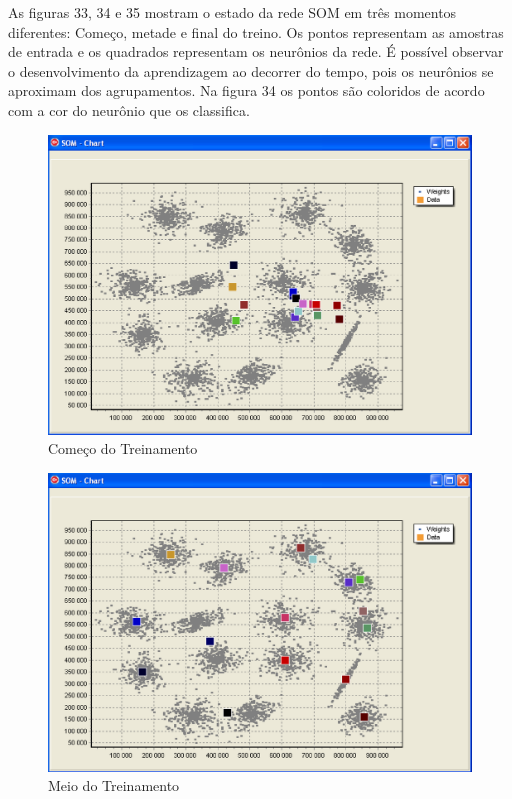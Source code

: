 As figuras 33, 34 e 35 mostram o estado da rede SOM em três momentos diferentes: Começo, metade e final do treino. Os pontos representam as amostras de entrada e os quadrados representam os neurônios da rede. É possível observar o desenvolvimento da aprendizagem ao decorrer do tempo, pois os neurônios se aproximam dos agrupamentos. Na figura 34 os pontos são coloridos de acordo com a cor do neurônio que os classifica.

\begin{figure}[!h]
\centering
\includegraphics[keepaspectratio=true,scale=0.5]
{figuras/som1.eps}
\caption{Começo do Treinamento}
\label{data_titatic}
\end{figure} 


\begin{figure}[!h]
\centering
\includegraphics[keepaspectratio=true,scale=0.5]
{figuras/som2.eps}
\caption{Meio do Treinamento}
\label{data_titatic}
\end{figure} 


